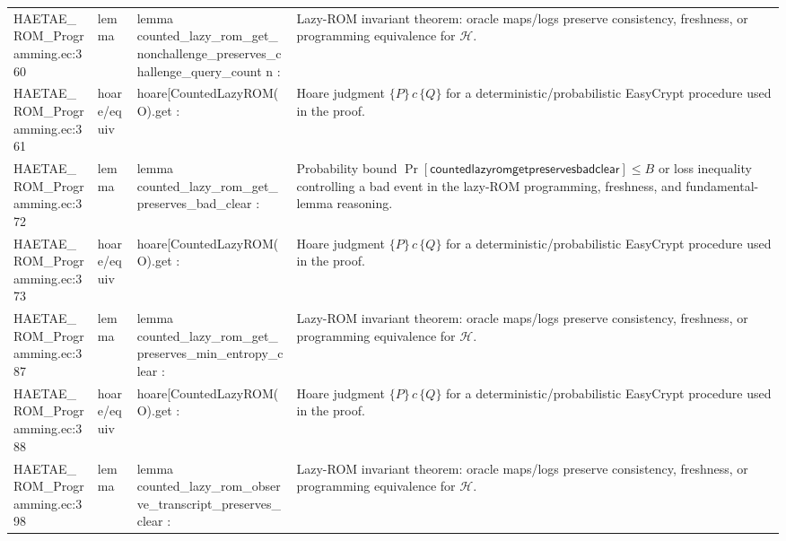 \documentclass[10pt]{article}
\begin{document}
\begin{longtable}{L{0.11\textwidth}L{0.055\textwidth}L{0.385\textwidth}L{0.41\textwidth}}
HAETAE\_\allowbreak{}ROM\_\allowbreak{}Programming.\allowbreak{}ec:\allowbreak{}360 & lemma & {\ttfamily\scriptsize lemma counted\_\allowbreak{}lazy\_\allowbreak{}rom\_\allowbreak{}get\_\allowbreak{}nonchallenge\_\allowbreak{}preserves\_\allowbreak{}challenge\_\allowbreak{}query\_\allowbreak{}count n :} & Lazy-ROM invariant theorem: oracle maps/logs preserve consistency, freshness, or programming equivalence for $\mathcal H$. \\
HAETAE\_\allowbreak{}ROM\_\allowbreak{}Programming.\allowbreak{}ec:\allowbreak{}361 & hoare/equiv & {\ttfamily\scriptsize hoare[CountedLazyROM(O).get :} & Hoare judgment $\{P\}\,c\,\{Q\}$ for a deterministic/probabilistic EasyCrypt procedure used in the proof. \\
HAETAE\_\allowbreak{}ROM\_\allowbreak{}Programming.\allowbreak{}ec:\allowbreak{}372 & lemma & {\ttfamily\scriptsize lemma counted\_\allowbreak{}lazy\_\allowbreak{}rom\_\allowbreak{}get\_\allowbreak{}preserves\_\allowbreak{}bad\_\allowbreak{}clear :} & Probability bound $\Pr[\mathsf{countedlazyromgetpreservesbadclear}]\le B$ or loss inequality controlling a bad event in the lazy-ROM programming, freshness, and fundamental-lemma reasoning. \\
HAETAE\_\allowbreak{}ROM\_\allowbreak{}Programming.\allowbreak{}ec:\allowbreak{}373 & hoare/equiv & {\ttfamily\scriptsize hoare[CountedLazyROM(O).get :} & Hoare judgment $\{P\}\,c\,\{Q\}$ for a deterministic/probabilistic EasyCrypt procedure used in the proof. \\
HAETAE\_\allowbreak{}ROM\_\allowbreak{}Programming.\allowbreak{}ec:\allowbreak{}387 & lemma & {\ttfamily\scriptsize lemma counted\_\allowbreak{}lazy\_\allowbreak{}rom\_\allowbreak{}get\_\allowbreak{}preserves\_\allowbreak{}min\_\allowbreak{}entropy\_\allowbreak{}clear :} & Lazy-ROM invariant theorem: oracle maps/logs preserve consistency, freshness, or programming equivalence for $\mathcal H$. \\
HAETAE\_\allowbreak{}ROM\_\allowbreak{}Programming.\allowbreak{}ec:\allowbreak{}388 & hoare/equiv & {\ttfamily\scriptsize hoare[CountedLazyROM(O).get :} & Hoare judgment $\{P\}\,c\,\{Q\}$ for a deterministic/probabilistic EasyCrypt procedure used in the proof. \\
HAETAE\_\allowbreak{}ROM\_\allowbreak{}Programming.\allowbreak{}ec:\allowbreak{}398 & lemma & {\ttfamily\scriptsize lemma counted\_\allowbreak{}lazy\_\allowbreak{}rom\_\allowbreak{}observe\_\allowbreak{}transcript\_\allowbreak{}preserves\_\allowbreak{}clear :} & Lazy-ROM invariant theorem: oracle maps/logs preserve consistency, freshness, or programming equivalence for $\mathcal H$. \\

\end{longtable}
\end{document}
